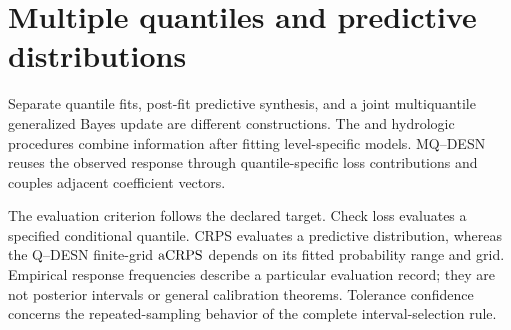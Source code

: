 \section{Multiple quantiles and predictive distributions}

Separate quantile fits, post-fit predictive synthesis, and a joint
multiquantile generalized Bayes update are different constructions. The  and
hydrologic procedures combine information after fitting level-specific
models. MQ--DESN reuses the observed response through quantile-specific loss
contributions and couples adjacent coefficient vectors.

The evaluation criterion follows the declared target. Check loss evaluates a
specified conditional quantile. CRPS evaluates a predictive distribution,
whereas the Q--DESN finite-grid \(\operatorname{aCRPS}\) depends on its fitted probability
range and grid. Empirical response frequencies describe a particular
evaluation record; they are not posterior intervals or general calibration
theorems. Tolerance confidence concerns the repeated-sampling behavior of the
complete interval-selection rule.
